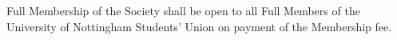 \begin{clause}  
  Full Membership of the Society shall be open to all Full Members of the University of Nottingham Students' Union on payment of the Membership fee.
\end{clause}